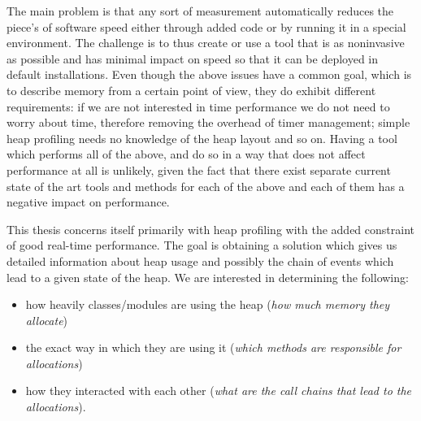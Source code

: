 	The main problem is that any sort of measurement automatically reduces the piece's of software speed either through added code or by running it in a special environment. The challenge is to thus create or use a tool that is as noninvasive as possible and has minimal impact on speed so that it can be deployed in default installations. Even though the above issues have a common goal, which is to describe memory from a certain point of view, they do exhibit different requirements: if we are not interested in time performance we do not need to worry about time, therefore removing the overhead of timer management; simple heap profiling needs no knowledge of the heap layout and so on. Having a tool which performs all of the above, and do so in a way that does not affect performance at all is unlikely, given the fact that there exist separate current state of the art tools and methods for each of the above and each of them has a negative impact on performance.

	This thesis concerns itself primarily with heap profiling with the added constraint of good real-time performance. The goal is obtaining a solution which gives us detailed information about heap usage and possibly the chain of events which lead to a given state of the heap. We are interested in determining the following:
\begin{itemize}
\item how heavily classes/modules are using the heap (\textit{how much memory they allocate})
\item the exact way in which they are using it (\textit{which methods are responsible for allocations})
\item how they interacted with each other (\textit{what are the call chains that lead to the allocations}).
\end{itemize}
